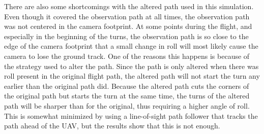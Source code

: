 There are also some shortcomings with the altered path used in this simulation. Even though it covered the observation path at all times, the observation path was not centered in the camera footprint. At some points during the flight, and especially in the beginning of the turns, the observation path is so close to the edge of the camera footprint that a small change in roll will most likely cause the camera to lose the ground track. One of the reasons this happens is because of the strategy used to alter the path. Since the path is only altered when there was roll present in the original flight path, the altered path will not start the turn any earlier than the original path did. Because the altered path cuts the corners of the original path but starts the turn at the same time, the turns of the altered path will be sharper than for the original, thus requiring a higher angle of roll. This is somewhat minimized by using a line-of-sight path follower that tracks the path ahead of the UAV, but the results show that this is not enough.



